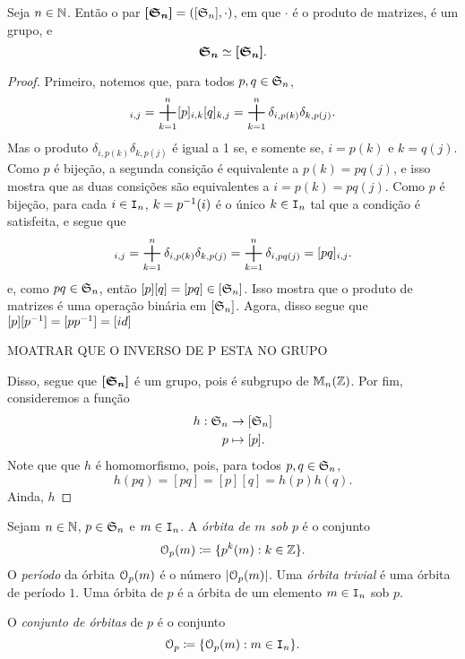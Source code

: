 \begin{prop}
	Seja $n \in \mathbb{N}$. Então o par $\bm{[\mathfrak{S}_n]}=([\mathfrak{S}_n],\cdot)$, em que $\cdot$ é o produto de matrizes, é um grupo, e
	\begin{equation*}
	\bm{\mathfrak{S}_n} \simeq \bm{[\mathfrak{S}_n]}.
	\end{equation*}
\end{prop}
\begin{proof}
	Primeiro, notemos que, para todos $p,q \in \mathfrak{S}_n$,
	\begin{equation*}
	[p][q]_{i,j} = \bigsum_{k=1}^n [p]_{i,k}[q]_{k,j} = \bigsum_{k=1}^n \delta_{i,p(k)}\delta_{k,p(j)}.
	\end{equation*}
	Mas o produto $\delta_{i,p(k)}\delta_{k,p(j)}$ é igual a 1 se, e somente se, $i=p(k)$ e $k=q(j)$. Como $p$ é bijeção, a segunda consição é equivalente a $p(k)=pq(j)$, e isso mostra que as duas consições são equivalentes a $i=p(k)=pq(j)$. Como $p$ é bijeção, para cada $i \in \mathtt I_n$, $k=p^{-1}(i)$ é o único $k \in \mathtt I_n$ tal que a condição é satisfeita, e segue que
	\begin{equation*}
	[p][q]_{i,j} = \bigsum_{k=1}^n \delta_{i,p(k)}\delta_{k,p(j)} = \bigsum_{k=1}^n \delta_{i,pq(j)} = [pq]_{i,j}.
	\end{equation*}
e, como $pq \in \mathfrak{S}_n$, então $[p][q]=[pq] \in [\mathfrak{S}_n]$. Isso mostra que o produto de matrizes é uma operação binária em $[\mathfrak{S}_n]$. Agora, disso segue que $[p][p^{-1}]=[pp^{-1}]=[id]$

MOATRAR QUE O INVERSO DE P ESTA NO GRUPO




Disso, segue que $\bm{[\mathfrak{S}_n]}$ é um grupo, pois é subgrupo de $\mathbb M_n(\mathbb{Z})$. Por fim, consideremos a função
	\begin{align*}
	h: \mathfrak{S}_n &\to [\mathfrak{S}_n] \\
			p &\mapsto [p].
	\end{align*}
Note que que $h$ é homomorfismo, pois, para todos $p,q \in \mathfrak{S}_n$,
	\begin{equation*}
	h(pq) = [pq]= [p][q] = h(p)h(q).
	\end{equation*}
Ainda, $h$
\end{proof}

\begin{defi}
	Sejam $n \in \mathbb{N}$, $p \in \mathfrak{S}_n$ e $m \in \mathtt I_n$. A \emph{órbita de $m$ sob $p$} é o conjunto
	\begin{equation*}
	\mathcal{O}_p(m) \coloneqq \{p^k(m) : k \in \mathbb{Z}\}.
	\end{equation*}
O \emph{período} da órbita $\mathcal{O}_p(m)$ é o número $\left\vert{\mathcal{O}_p(m)}\right\vert$. Uma \emph{órbita trivial} é uma órbita de período $1$. Uma órbita de $p$ é a órbita de um elemento $m \in \mathtt I_n$ sob $p$.

	O \emph{conjunto de órbitas} de $p$ é o conjunto
	\begin{equation*}
	\mathcal{O}_p \coloneqq \{\mathcal{O}_p(m) : m \in \mathtt I_n\}.
	\end{equation*}
\end{defi}

